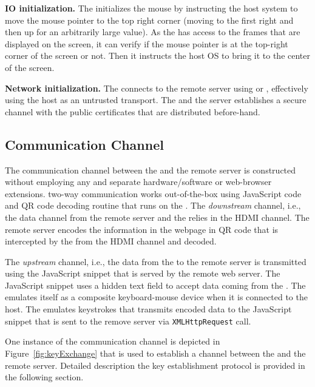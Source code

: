 \begin{mylist}
  \item\textbf{IO initialization.} The \device initializes the mouse by instructing the host system to move the mouse pointer to the top right corner (moving to the first right and then up for an arbitrarily large value). As the \device has access to the frames that are displayed on the screen, it can verify if the mouse pointer is at the top-right corner of the screen or not. Then it instructs the host OS to bring it to the center of the screen.
  
  \item\textbf{Network initialization.} The \device connects to the remote server using \webusb or \webbt, effectively using the host as an untrusted transport. The \device and the server establishes a secure channel with the public certificates that are distributed before-hand.
\end{mylist}
\fi

\subsection{Communication Channel}
\label{sec:systemDesign:communicationChannel}

The communication channel between the \device and the remote server is constructed without employing any and separate hardware/software or web-browser extensions. \name two-way communication works out-of-the-box using JavaScript code and QR code decoding routine that runs on the \device. The \emph{downstream} channel, i.e., the data channel from the remote server and the \device relies in the HDMI channel. The remote server encodes the information in the webpage in QR code that is intercepted by the \device from the HDMI channel and decoded.

The \emph{upstream} channel, i.e., the data from the \device to the remote server is transmitted using the \name JavaScript snippet that is served by the remote web server. The \name JavaScript snippet uses a hidden text field to accept data coming from the \device. The \device emulates itself as a composite keyboard-mouse device when it is connected to the host. The \device emulates keystrokes that transmits encoded data to the \name JavaScript snippet that is sent to the remove server via \texttt{XMLHttpRequest} call.

One instance of the communication channel is depicted in Figure~\ref{fig:keyExchange} that is used to establish a \tls channel between the \device and the remote server. Detailed description the key establishment protocol is provided in the following section.


